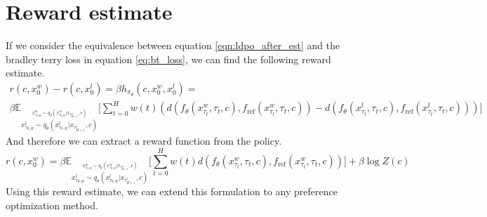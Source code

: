 \documentclass[10pt]{article}
\begin{document}
\section{Reward estimate}

If we consider the equivalence between equation \ref{eqn:ldpo_after_est} and the bradley terry loss in equation \ref{eq:bt_loss}, we can find the following reward estimate.
\begin{multline}
	r(c, x_0^w)-r(c, x_0^l)=\beta h_{\pi_\theta}(c, x_0^w, x_0^l)=\\
	\beta\mathbb{E}_{
		\stackrel{x_{\tau_{0:H}}^w\sim q_\theta(x_{\tau_{0:H}}^w|x_{\tau_{H+1}^w},c)}{x_{\tau_{0:H}}^l\sim q_\theta(x_{\tau_{0:H}}^l|x_{\tau_{H+1}^l},c)}}
	\Bigg[\sum_{t=0}^H
		w(t)\left(d(f_\theta(x^w_{\tau_t},\tau_t,c),f_\text{ref}(x^w_{\tau_t},\tau_t,c))
		-d(f_\theta(x^l_{\tau_t},\tau_t,c),f_\text{ref}(x^l_{\tau_t},\tau_t,c))\right) \Bigg]
\end{multline}
And therefore we can extract a reward function from the policy.
\begin{equation}
	r(c, x_0^w)=\beta\mathbb{E}_{
		\stackrel{x_{\tau_{0:H}}^w\sim q_\theta(x_{\tau_{0:H}}^w|x_{\tau_{H+1}^w},c)}{x_{\tau_{0:H}}^l\sim q_\theta(x_{\tau_{0:H}}^l|x_{\tau_{H+1}^l},c)}}
	\Bigg[\sum_{t=0}^H
		w(t)d(f_\theta(x^w_{\tau_t},\tau_t,c),f_\text{ref}(x^w_{\tau_t},\tau_t,c))
		 \Bigg]+\beta\log Z(c)
\end{equation}
Using this reward estimate, we can extend this formulation to any preference optimization method.
\end{document}
